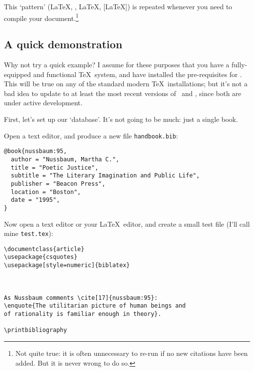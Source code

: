 This `pattern' (\LaTeX, , \LaTeX, [\LaTeX]) is repeated
whenever you need to compile your document.\footnote{Not quite true:
  it is often unnecessary to re-run  if no new
  citations have been added. But it is never wrong to do so.}

\subsection{A quick demonstration\label{neophyte:example}}
Why not try a quick example? I assume for these purposes that you have
a fully-equipped and functional \TeX\ system, and have installed the
pre-requisites for \biblatex. This will be true on any of the standard
modern \TeX\ installations; but it's not a bad idea to update to at
least the most recent versions of \biblatex\ and ,
since both are under active development.

First, let's set up our `database'. It's not going to be much: just a
single book.

Open a text editor, and produce a new file
\texttt{handbook.bib}:

\begin{verbatim}
@book{nussbaum:95,
  author = "Nussbaum, Martha C.",
  title = "Poetic Justice",
  subtitle = "The Literary Imagination and Public Life",
  publisher = "Beacon Press",
  location = "Boston",
  date = "1995",
}
\end{verbatim}

Now open a text editor or your \LaTeX\ editor, and create a small test
file (I'll call mine \texttt{test.tex}):

\begin{verbatim}
\documentclass{article}
\usepackage{csquotes}
\usepackage[style=numeric]{biblatex}



As Nussbaum comments \cite[17]{nussbaum:95}:
\enquote{The utilitarian picture of human beings and
of rationality is familiar enough in theory}.

\printbibliography

\end{verbatim}

